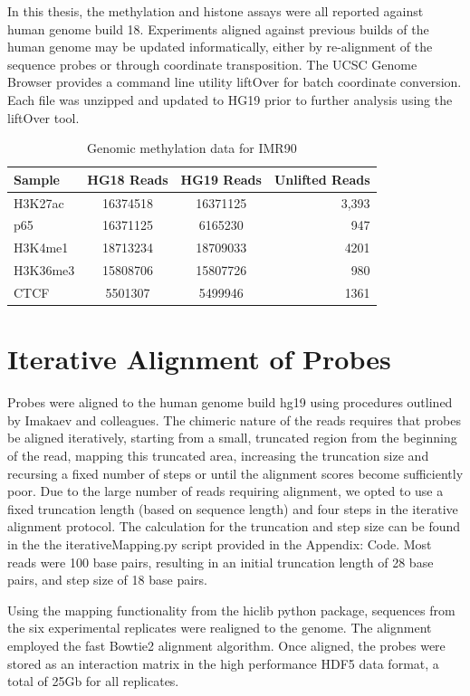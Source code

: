 \documentclass[phd,tocprelim]{cornell}
\begin{document}
In this thesis, the methylation and histone assays were all reported against human genome build 18.  Experiments aligned
against previous builds of the human genome may be updated informatically, either by re-alignment of the
sequence probes or through coordinate transposition.  The UCSC Genome Browser provides a command line utility liftOver for
batch coordinate conversion.  Each file was unzipped and updated to HG19 prior to further analysis using the liftOver tool.

\begin{table}
  \centering
  \begin{tabular}{lccr}
    \hline
    Sample & HG18 Reads & HG19 Reads & Unlifted Reads \\ \hline
    H3K27ac & 16374518 & 16371125 & 3,393 \\
    p65 & 16371125 & 6165230 & 947 \\
    H3K4me1 & 18713234 & 18709033 & 4201 \\
    H3K36me3 & 15808706 & 15807726 & 980 \\
    CTCF & 5501307 & 5499946 & 1361 \\
    \hline
  \end{tabular}
  \caption{Genomic methylation data for IMR90}
\end{table}

\chapter{Iterative Alignment of Probes}

Probes were aligned to the human genome build hg19 using procedures outlined by
Imakaev and colleagues\cite{imakaev2012}.  The chimeric nature of the reads
requires that probes be aligned iteratively, starting from a small, truncated
region from the beginning of the read, mapping this truncated area, increasing
the truncation size and recursing a fixed number of steps or until the alignment
scores become sufficiently poor.  Due to the large number of reads requiring
alignment, we opted to use a fixed truncation length (based on sequence length)
and four steps in the iterative alignment protocol.  The calculation
for the truncation and step size can be found in the the iterativeMapping.py
script provided in the Appendix: Code.  Most reads were 100 base pairs, resulting
in an initial truncation length of 28 base pairs, and step size of 18 base pairs.

Using the mapping functionality from the hiclib python package\cite{imakaev2012},
sequences from the six experimental replicates were realigned to the genome.  The
alignment employed the fast Bowtie2 alignment algorithm\cite{langmead2012}.  Once
aligned, the probes were stored as an interaction matrix in the high performance
HDF5\cite{hdf5} data format, a total of 25Gb for all replicates.
\end{document}
